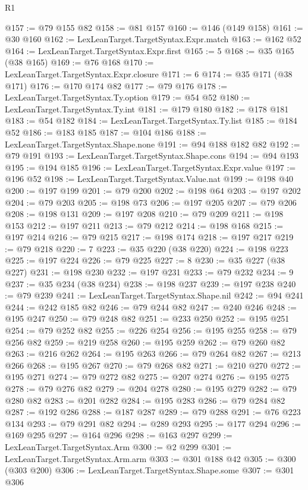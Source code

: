 \begin{lexlean}{R1}
\begin{coremodule}
@157 := @79 @155 @82
@158 := @81 @157
@160 := @146 (@149 @158)
@161 := @30 @160
@162 := LexLeanTarget.TargetSyntax.Expr.match
@163 := @162 @52
@164 := LexLeanTarget.TargetSyntax.Expr.first
@165 := 5
@168 := @35 @165 (@38 @165)
@169 := @76 @168
@170 := LexLeanTarget.TargetSyntax.Expr.closure
@171 := 6
@174 := @35 @171 (@38 @171)
@176 := @170 @174 @82
@177 := @79 @176
@178 := LexLeanTarget.TargetSyntax.Ty.option
@179 := @54 @52
@180 := LexLeanTarget.TargetSyntax.Ty.int
@181 := @179 @180
@182 := @178 @181
@183 := @54 @182
@184 := LexLeanTarget.TargetSyntax.Ty.list
@185 := @184 @52
@186 := @183 @185
@187 := @104 @186
@188 := LexLeanTarget.TargetSyntax.Shape.none
@191 := @94 @188 @182 @82
@192 := @79 @191
@193 := LexLeanTarget.TargetSyntax.Shape.cons
@194 := @94 @193
@195 := @194 @185
@196 := LexLeanTarget.TargetSyntax.Expr.value
@197 := @196 @52
@198 := LexLeanTarget.TargetSyntax.Value.nat
@199 := @198 @40
@200 := @197 @199
@201 := @79 @200
@202 := @198 @64
@203 := @197 @202
@204 := @79 @203
@205 := @198 @73
@206 := @197 @205
@207 := @79 @206
@208 := @198 @131
@209 := @197 @208
@210 := @79 @209
@211 := @198 @153
@212 := @197 @211
@213 := @79 @212
@214 := @198 @168
@215 := @197 @214
@216 := @79 @215
@217 := @198 @174
@218 := @197 @217
@219 := @79 @218
@220 := 7
@223 := @35 @220 (@38 @220)
@224 := @198 @223
@225 := @197 @224
@226 := @79 @225
@227 := 8
@230 := @35 @227 (@38 @227)
@231 := @198 @230
@232 := @197 @231
@233 := @79 @232
@234 := 9
@237 := @35 @234 (@38 @234)
@238 := @198 @237
@239 := @197 @238
@240 := @79 @239
@241 := LexLeanTarget.TargetSyntax.Shape.nil
@242 := @94 @241
@244 := @242 @185 @82
@246 := @79 @244 @82
@247 := @240 @246
@248 := @195 @247
@250 := @79 @248 @82
@251 := @233 @250
@252 := @195 @251
@254 := @79 @252 @82
@255 := @226 @254
@256 := @195 @255
@258 := @79 @256 @82
@259 := @219 @258
@260 := @195 @259
@262 := @79 @260 @82
@263 := @216 @262
@264 := @195 @263
@266 := @79 @264 @82
@267 := @213 @266
@268 := @195 @267
@270 := @79 @268 @82
@271 := @210 @270
@272 := @195 @271
@274 := @79 @272 @82
@275 := @207 @274
@276 := @195 @275
@278 := @79 @276 @82
@279 := @204 @278
@280 := @195 @279
@282 := @79 @280 @82
@283 := @201 @282
@284 := @195 @283
@286 := @79 @284 @82
@287 := @192 @286
@288 := @187 @287
@289 := @79 @288
@291 := @76 @223 @134
@293 := @79 @291 @82
@294 := @289 @293
@295 := @177 @294
@296 := @169 @295
@297 := @164 @296
@298 := @163 @297
@299 := LexLeanTarget.TargetSyntax.Arm
@300 := @2 @299
@301 := LexLeanTarget.TargetSyntax.Arm.arm
@303 := @301 @188 @42
@305 := @300 (@303 @200)
@306 := LexLeanTarget.TargetSyntax.Shape.some
@307 := @301 @306

\end{coremodule}
\end{lexlean}
